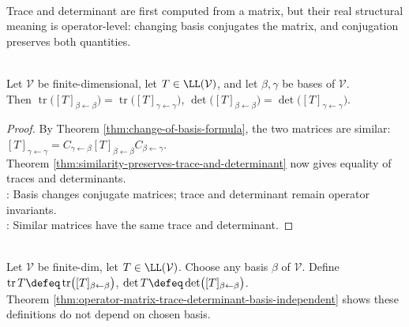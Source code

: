 \begin{principle} \label{princ:trace-determinant-coordinate-free} \\
Trace and determinant are first computed from a matrix, but their real structural meaning is operator-level: changing basis conjugates the matrix, and conjugation preserves both quantities.
\end{principle}

\begin{theorem} \label{thm:operator-matrix-trace-determinant-basis-independent} \\
Let $\mathcal{V}$ be finite-dimensional, let $T\in\LL(\mathcal{V})$, and let $\beta,\gamma$ be bases of $\mathcal{V}$.\\
Then $\operatorname{tr}\bigl([T]_{\beta\leftarrow\beta}\bigr) =\operatorname{tr}\bigl([T]_{\gamma\leftarrow\gamma}\bigr)$, $\det\bigl([T]_{\beta\leftarrow\beta}\bigr) =\det\bigl([T]_{\gamma\leftarrow\gamma}\bigr)$.
\begin{proof}
By Theorem \ref{thm:change-of-basis-formula}, the two matrices are similar: $[T]_{\gamma\leftarrow\gamma} =C_{\gamma\leftarrow\beta}[T]_{\beta\leftarrow\beta}C_{\beta\leftarrow\gamma}$.\\
Theorem \ref{thm:similarity-preserves-trace-and-determinant} now gives equality of traces and determinants.\\
: Basis changes conjugate matrices; trace and determinant remain operator invariants.\\
: Similar matrices have the same trace and determinant.
\end{proof}
\end{theorem}

\begin{definition} \label{def:operator-trace-and-determinant} \\
Let $\mathcal{V}$ be finite-dim, let $T\in\LL(\mathcal{V})$. Choose any basis $\beta$ of $\mathcal{V}$. Define $\operatorname{tr}T\defeq\operatorname{tr}\bigl([T]_{\beta\leftarrow\beta}\bigr)$, $\det T\defeq\det\bigl([T]_{\beta\leftarrow\beta}\bigr)$.\\
Theorem \ref{thm:operator-matrix-trace-determinant-basis-independent} shows these definitions do not depend on chosen basis.
\end{definition}

